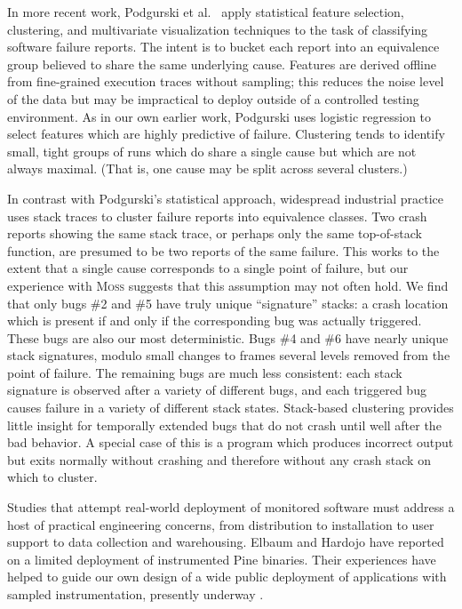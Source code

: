 \documentclass{sig-alternate}
\newcommand{\moss}{\textsc{Moss}\xspace}
\newcommand{\comment}[1]{}
\begin{document}
In more recent work, Podgurski et al.\ \cite{ICSE`03*465} apply
statistical feature selection, clustering, and multivariate
visualization techniques to the task of classifying software failure
reports.  The intent is to bucket each report into an equivalence
group believed to share the same underlying cause.  Features are
derived offline from fine-grained execution traces without sampling;
this reduces the noise level of the data but may be impractical to
deploy outside of a controlled testing environment.  As in our own
earlier work, Podgurski uses logistic regression to select features
which are highly predictive of failure.  \comment{Is it worth noting
  that we use different strategies for limiting the size of the set of
  selected features?  We use regularized logistic regression whereas
  Podgurski applies standard logistic regression to randomly selected
  subsets of the complete feature set and keeps the best-performing
  subset.}  Clustering tends to identify small, tight groups of runs
which do share a single cause but which are not always maximal.  (That
is, one cause may be split across several clusters.)

In contrast with Podgurski's statistical approach, widespread
industrial practice uses stack traces to cluster failure reports into
equivalence classes.  Two crash reports showing the same stack trace,
or perhaps only the same top-of-stack function, are presumed to be two
reports of the same failure.  This works to the extent that a single
cause corresponds to a single point of failure, but our experience
with \moss suggests that this assumption may not often hold.  We find
that only bugs \#2 and \#5 have truly unique ``signature'' stacks: a
crash location which is present if and only if the corresponding bug
was actually triggered.  These bugs are also our most deterministic.
Bugs \#4 and \#6 have nearly unique stack signatures, modulo small
changes to frames several levels removed from the point of failure.
The remaining bugs are much less consistent: each stack signature is
observed after a variety of different bugs, and each triggered bug
causes failure in a variety of different stack states.  Stack-based
clustering provides little insight for temporally extended bugs that
do not crash until well after the bad behavior.  A special case of
this is a program which produces incorrect output but exits normally
without crashing and therefore without any crash stack on which to
cluster.

Studies that attempt real-world deployment of monitored software must
address a host of practical engineering concerns, from distribution to
installation to user support to data collection and warehousing.
Elbaum and Hardojo \cite{Elbaum:2003:DISATA} have reported on a
limited deployment of instrumented Pine binaries.  Their experiences
have helped to guide our own design of a wide public deployment of
applications with sampled instrumentation, presently underway
\cite{Liblit:2003:CBIP}.
\end{document}
